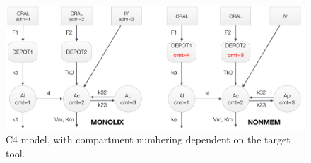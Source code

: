 \begin{figure}[htbp!]
\centering
 \includegraphics[width=160mm]{pics/ComplexModel4}
\caption{C4 model, with compartment numbering dependent on the target tool.}
\label{fig:ComplexModel4}
\end{figure}

